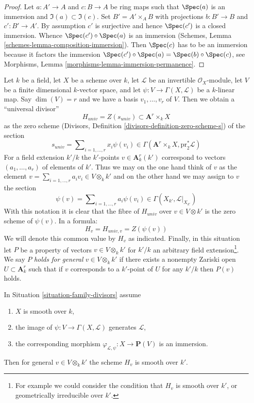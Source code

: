 \begin{proof}
\medskip\noindent
Let $a : A' \to A$ and $c : B \to A$ be ring maps such that
$\Spec(a)$ is an immersion and $\Im(a) \subset \Im(c)$.
Set $B' = A' \times_A B$ with projections $b : B' \to B$
and $c' : B' \to A'$. By assumption $c'$
is surjective and hence $\Spec(c')$ is a closed immersion.
Whence $\Spec(c') \circ \Spec(a)$ is an immersion
(Schemes, Lemma \ref{schemes-lemma-composition-immersion}).
Then $\Spec(c)$ has to be an immersion because it factors
the immersion $\Spec(c') \circ \Spec(a) = \Spec(b) \circ \Spec(c)$, see
Morphisms, Lemma \ref{morphisms-lemma-immersion-permanence}.
\end{proof}

\begin{situation}
\label{situation-family-divisors}
Let $k$ be a field,
let $X$ be a scheme over $k$,
let $\mathcal{L}$ be an invertible $\mathcal{O}_X$-module,
let $V$ be a finite dimensional $k$-vector space, and
let $\psi : V \to \Gamma(X, \mathcal{L})$ be a $k$-linear map.
Say $\dim(V) = r$ and we have a basis $v_1, \ldots, v_r$ of $V$.
Then we obtain a ``universal divisor''
$$
H_{univ} = Z(s_{univ}) \subset  \mathbf{A}^r \times_k X
$$
as the zero scheme
(Divisors, Definition \ref{divisors-definition-zero-scheme-s}) of the section
$$
s_{univ} = \sum\nolimits_{i = 1, \ldots, r} x_i \psi(v_i) \in
\Gamma(\mathbf{A}^r \times_k X, \text{pr}_2^*\mathcal{L})
$$
For a field extension $k'/k$ the $k'$-points $v \in \mathbf{A}^r_k(k')$
correspond to vectors $(a_1, \ldots, a_r)$ of elements of $k'$.
Thus we may on the one hand think of $v$ as the element
$v = \sum_{i = 1, \ldots, r} a_i v_i \in V \otimes_k k'$
and on the other hand we may assign to $v$ the section
$$
\psi(v) = \sum\nolimits_{i = 1, \ldots, r} a_i \psi(v_i) \in
\Gamma(X_{k'}, \mathcal{L}|_{X_{k'}})
$$
With this notation it is clear that the fibre of $H_{univ}$ over
$v \in V \otimes k'$ is the zero scheme of $\psi(v)$.
In a formula:
$$
H_v = H_{univ, v} = Z(\psi(v))
$$
We will denote this common value by $H_v$ as indicated. Finally, in
this situation let $P$ be a property of vectors $v \in V \otimes_k k'$
for $k'/k$ an arbitrary field extension\footnote{For example we could
consider the condition that $H_v$ is smooth over $k'$, or geometrically
irreducible over $k'$.}. We say $P$ {\it holds for general}
$v \in V \otimes_k k'$ if there exists a nonempty Zariski open
$U \subset \mathbf{A}^r_k$ such that if $v$ corresponds to a $k'$-point
of $U$ for any $k'/k$ then $P(v)$ holds.
\end{situation}

\begin{lemma}
\label{lemma-bertini}
In Situation \ref{situation-family-divisors} assume
\begin{enumerate}
\item $X$ is smooth over $k$,
\item the image of $\psi : V \to \Gamma(X, \mathcal{L})$
generates $\mathcal{L}$,
\item the corresponding morphism
$\varphi_{\mathcal{L}, \psi} : X \to \mathbf{P}(V)$ is
an immersion.
\end{enumerate}
Then for general $v \in V \otimes_k k'$
the scheme $H_v$ is smooth over $k'$.
\end{lemma}

